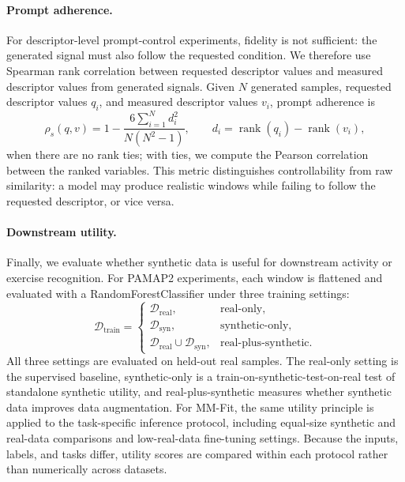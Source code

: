 \paragraph{Prompt adherence.}
For descriptor-level prompt-control experiments, fidelity is not sufficient:
the generated signal must also follow the requested condition. We therefore use
Spearman rank correlation \cite{spearman1904general} between requested
descriptor values and measured descriptor values from generated signals. Given
$N$ generated samples, requested descriptor values $q_i$, and measured
descriptor values $v_i$, prompt adherence is
\begin{equation}
    \rho_s(q,v)
    =
    1
    -
    \frac{6\sum_{i=1}^{N}d_i^2}
    {N(N^2-1)},
    \qquad
    d_i=\operatorname{rank}(q_i)-\operatorname{rank}(v_i),
\end{equation}
when there are no rank ties; with ties, we compute the Pearson correlation
between the ranked variables. This metric distinguishes controllability from
raw similarity: a model may produce realistic windows while failing to follow
the requested descriptor, or vice versa.

\paragraph{Downstream utility.}
Finally, we evaluate whether synthetic data is useful for downstream activity or
exercise recognition. For PAMAP2 experiments, each window is flattened and
evaluated with a RandomForestClassifier \cite{breiman2001randomforest} under
three training settings:
\begin{equation}
    \mathcal{D}_{\mathrm{train}}
    =
    \begin{cases}
    \mathcal{D}_{\mathrm{real}}, &
    \text{real-only},\\
    \mathcal{D}_{\mathrm{syn}}, &
    \text{synthetic-only},\\
    \mathcal{D}_{\mathrm{real}}\cup\mathcal{D}_{\mathrm{syn}}, &
    \text{real-plus-synthetic}.
    \end{cases}
\end{equation}
All three settings are evaluated on held-out real samples. The real-only setting
is the supervised baseline, synthetic-only is a train-on-synthetic-test-on-real
test of standalone synthetic utility, and real-plus-synthetic measures whether
synthetic data improves data augmentation. For MM-Fit, the same utility
principle is applied to the task-specific inference protocol, including
equal-size synthetic and real-data comparisons and low-real-data fine-tuning
settings. Because the inputs, labels, and tasks differ, utility scores are
compared within each protocol rather than numerically across datasets.

